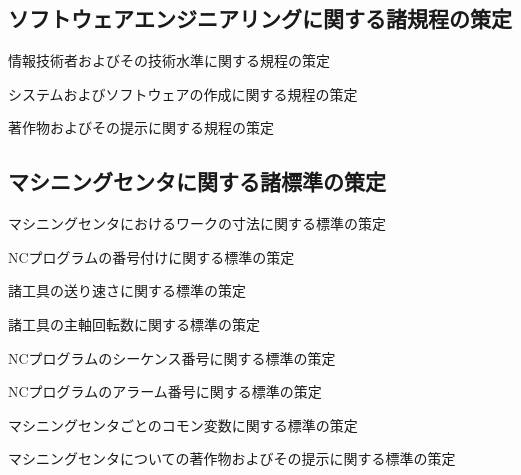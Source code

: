 \subsection{ソフトウェアエンジニアリングに関する諸規程の策定}
\begin{enumerate}[label={\sarrow[red]}]
\item {}情報技術者およびその技術水準に関する規程の策定
\item システムおよびソフトウェアの作成に関する規程の策定
\item {}著作物およびその提示に関する規程の策定
\end{enumerate}


\subsection{マシニングセンタに関する諸標準の策定}
\begin{enumerate}[label={\sarrow[red]}]
\item マシニングセンタにおけるワークの寸法に関する標準の策定
\item {}NCプログラムの番号付けに関する標準の策定
\item 諸工具の送り速さに関する標準の策定
\item 諸工具の主軸回転数に関する標準の策定
\item {}NCプログラムのシーケンス番号に関する標準の策定
\item[\sarrow] NCプログラムのアラーム番号に関する標準の策定
\item マシニングセンタごとのコモン変数に関する標準の策定
\item マシニングセンタについての著作物およびその提示に関する標準の策定
\end{enumerate}



